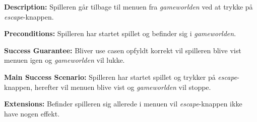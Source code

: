 \textbf{Description:} \newline
Spilleren går tilbage til menuen fra \textit{gameworlden} ved at trykke på \textit{escape}-knappen.\newline

\textbf{Preconditions:}\newline
Spilleren har startet spillet og befinder sig i \textit{gameworlden}.\newline

\textbf{Success Guarantee:}\newline
Bliver use casen opfyldt korrekt vil spilleren blive vist menuen igen og \textit{gameworlden} vil lukke.\newline

\textbf{Main Success Scenario:}\newline
Spilleren har startet spillet og trykker på \textit{escape}-knappen, herefter vil menuen blive vist og \textit{gameworlden} vil stoppe. \newline

\textbf{Extensions:}\newline
Befinder spilleren sig allerede i menuen vil \textit{escape}-knappen ikke have nogen effekt.\newline